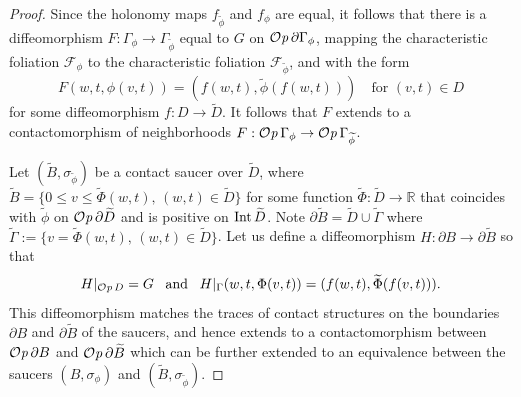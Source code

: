 \documentclass[12pt]{paper}
\theoremstyle{plain}
\theoremstyle{definition}
\newcommand{\wt}{\widetilde}
\newcommand{\p}{\partial}
\newcommand{\R}{{\mathbb{R}}}
\newcommand{\Int}{{\rm Int\,}} %
\newcommand{\FF}{\mathcal{F}}
\def\Op{{\mathcal O}{\it p}\,}
\numberwithin{figure}{section}
\begin{document}
\begin{proof}
Since the holonomy maps $f_{\wt\phi}$ and $f_\phi$ are equal, it follows that there is a diffeomorphism
$F:\Gamma_\phi\to \Gamma_{\wt\phi}$ equal to $G$ on $\Op{\p\Gamma_\phi}$, mapping
the characteristic foliation $\FF_\phi$ to the characteristic foliation $\FF_{\wt\phi}$, and with the form
$$F(w,t,\phi(v,t))=(f(w,t), \wt\phi(f(w,t))) \quad\mbox{for $(v,t)\in D$}$$
for some diffeomorphism $f:D\to\wt D$.  It follows that $F$ extends to a contactomorphism of
neighborhoods $F: \Op \Gamma_\phi \to \Op \Gamma_{\wt\phi}$.

Let $(\wt B,\sigma_{\wt\phi})$ be a contact saucer over $\wt D$, where $\wt B=\{0\leq v\leq\wt\Phi(w,t),\, (w,t)\in\wt D\}$ for some function $\wt\Phi:\wt D\to\R$ that coincides with $\wt\phi$ on $\Op\p\wt D$ and is positive on $\Int\wt D$. 
Note $\p\wt B=\wt D\cup\wt \Gamma$ where $\wt\Gamma:=\{v=\wt\Phi(w,t),\, (w,t)\in\wt D\}$.
Let us define a diffeomorphism $H:\p B\to\p\wt B$  so that
 $$
 H|_{\Op D}=G\;\;\; \hbox{and} \;\;\; H|_{\Gamma}(w,t,\Phi(v,t))=(f(w,t),\wt\Phi(f(v,t))).$$  
This diffeomorphism matches the  traces of contact structures on  the boundaries $\p B$ and $\p\wt B$ of the saucers, and hence extends to a contactomorphism 
 between $\Op\p B$ and $\Op\p\wt B$ which can be further extended to an equivalence between the saucers $(B,\sigma_\phi)$ and $(\wt B, \sigma_{\wt\phi})$.
 \end{proof}
 
\end{document}
